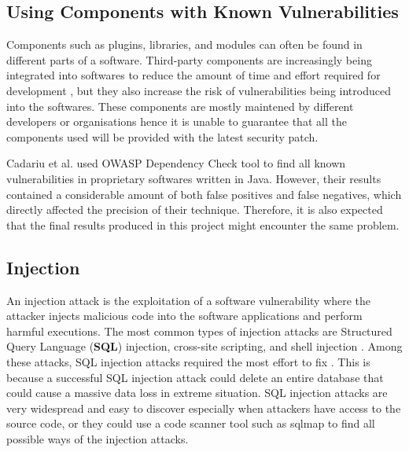\documentclass[12pt, a4paper]{report}
\begin{document}
\subsection{Using Components with Known Vulnerabilities} \label{subsec:components}
Components such as plugins, libraries, and modules can often be found in different parts of a
software. Third-party components are increasingly being integrated into softwares to reduce the
amount of time and effort required for development \cite{balzarotti_2006}, but they also increase
the risk of vulnerabilities being introduced into the softwares. These components are mostly
maintened by different developers or organisations hence it is unable to guarantee that all the
components used will be provided with the latest security patch.

Cadariu et al. \cite{cadariu_2015} used OWASP Dependency Check tool \cite{owasp_dependency} to find
all known vulnerabilities in proprietary softwares written in Java. However, their results contained
a considerable amount of both false positives and false negatives, which directly affected the
precision of their technique. Therefore, it is also expected that the final results produced in this
project might encounter the same problem.

\subsection{Injection} \label{subsec:injection}
An injection attack is the exploitation of a software vulnerability where the attacker injects
malicious code into the software applications and perform harmful executions. The most common types
of injection attacks are Structured Query Language (\textbf{SQL}) injection, cross-site scripting,
and shell injection \cite{pietraszek_2006}. Among these attacks, SQL injection attacks required the
most effort to fix \cite{othmane_2015}. This is because a successful SQL injection attack could
delete an entire database that could cause a massive data loss in extreme situation. SQL injection
attacks are very widespread and easy to discover especially when attackers have access to the source
code, or they could use a code scanner tool such as sqlmap \cite{sqlmap} to find all possible ways
of the injection attacks.
\end{document}

